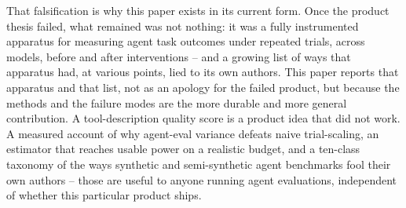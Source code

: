 \documentclass[11pt]{article}
\begin{document}
That falsification is why this paper exists in its current form. Once the product thesis failed,
what remained was not nothing: it was a fully instrumented apparatus for measuring agent task
outcomes under repeated trials, across models, before and after interventions -- and a growing list
of ways that apparatus had, at various points, lied to its own authors. This paper reports that
apparatus and that list, not as an apology for the failed product, but because the methods and the
failure modes are the more durable and more general contribution. A tool-description quality score
is a product idea that did not work. A measured account of why agent-eval variance defeats naive
trial-scaling, an estimator that reaches usable power on a realistic budget, and a ten-class
taxonomy of the ways synthetic and semi-synthetic agent benchmarks fool their own authors -- those
are useful to anyone running agent evaluations, independent of whether this particular product
ships.
\end{document}
